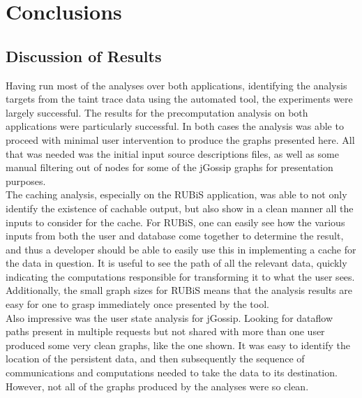 \documentclass[msc,oneside]{ubcthesis}
\begin{document}
\chapter{Conclusions} %

\section{Discussion of Results}

Having run most of the analyses over both applications, identifying the analysis targets from the taint trace data using the automated tool, the experiments were largely successful. The results for the precomputation analysis on both applications were particularly successful. In both cases the analysis was able to proceed with minimal user intervention to produce the graphs presented here. All that was needed was the initial input source descriptions files, as well as some manual filtering out of nodes for some of the jGossip graphs for presentation purposes.\\

The caching analysis, especially on the RUBiS application, was able to not only identify the existence of cachable output, but also show in a clean manner all the inputs to consider for the cache. For RUBiS, one can easily see how the various inputs from both the user and database come together to determine the result, and thus a developer should be able to easily use this in implementing a cache for the data in question. It is useful to see the path of all the relevant data, quickly indicating the computations responsible for transforming it to what the user sees. Additionally, the small graph sizes for RUBiS means that the analysis results are easy for one to grasp immediately once presented by the tool. \\

Also impressive was the user state analysis for jGossip. Looking for dataflow paths present in multiple requests but not shared with more than one user produced some very clean graphs, like the one shown. It was easy to identify the location of the persistent data, and then subsequently the sequence of communications and computations needed to take the data to its destination. However, not all of the graphs produced by the analyses were so clean.\\
\end{document}
